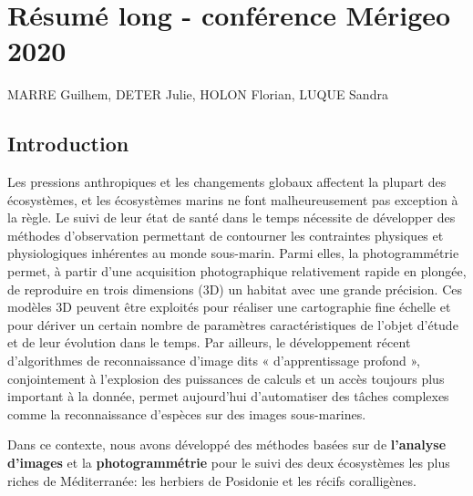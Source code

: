 \chapter{Résumé long - conférence Mérigeo 2020} \label{merigeo}

\newpage
\newpage

\normalsize
\medskip

\noindent MARRE Guilhem, DETER Julie, HOLON Florian, LUQUE Sandra
\medskip



\section*{Introduction}

Les pressions anthropiques et les changements globaux affectent la plupart des écosystèmes, et les écosystèmes marins ne font malheureusement pas exception à la règle. Le suivi de leur état de santé dans le temps nécessite de développer des méthodes d’observation permettant de contourner les contraintes physiques et physiologiques inhérentes au monde sous-marin. Parmi elles, la photogrammétrie permet, à partir d’une acquisition photographique relativement rapide en plongée, de reproduire en trois dimensions (3D) un habitat avec une grande précision. Ces modèles 3D peuvent être exploités pour réaliser une cartographie fine échelle et pour dériver un certain nombre de paramètres caractéristiques de l’objet d’étude et de leur évolution dans le temps. Par ailleurs, le développement récent d’algorithmes de reconnaissance d’image dits « d’apprentissage profond », conjointement à l’explosion des puissances de calculs et un accès toujours plus important à la donnée, permet aujourd’hui d’automatiser des tâches complexes comme la reconnaissance d’espèces sur des images sous-marines.

\medskip

\begin{tcolorbox}[colback=white,%
                  colframe=black,%
                  width=\linewidth,%
                  arc=3mm, auto outer arc,
                 ]
Dans ce contexte, nous avons développé des méthodes basées sur de \textbf{l’analyse d’images} et la \textbf{photogrammétrie} pour le suivi des deux écosystèmes les plus riches de Méditerranée: les herbiers de Posidonie et les récifs coralligènes.
\end{tcolorbox}


